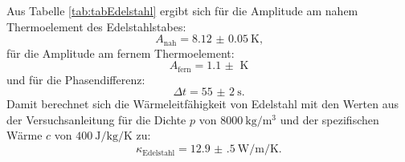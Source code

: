 Aus Tabelle \ref{tab:tabEdelstahl} ergibt sich für die Amplitude am nahem Thermoelement des Edelstahlstabes:
\begin{displaymath}
A_\text{nah} = \SI{8.12(5)}{\kelvin}\text{,}
\end{displaymath}
für die Amplitude am fernem Thermoelement:
\begin{displaymath}
A_\text{fern} = \SI{1.1(0)}{\kelvin}
\end{displaymath}
und für die Phasendifferenz:
\begin{displaymath}
\Delta t = \SI{55(2)}{\second}\text{.}
\end{displaymath}
Damit berechnet sich die Wärmeleitfähigkeit von Edelstahl mit den Werten aus der Versuchsanleitung \cite{V204} für die Dichte $p$ von $\SI{8000}{\kilo\gram\per\meter\tothe{3}}$ und der spezifischen Wärme $c$ von $\SI{400}{\joule\per\kilo\gram\per\kelvin}$ zu:
\begin{displaymath}
\kappa_\text{Edelstahl} = \SI{12.9(5)}{\watt\per\meter\per\kelvin}\text{.}
\end{displaymath}